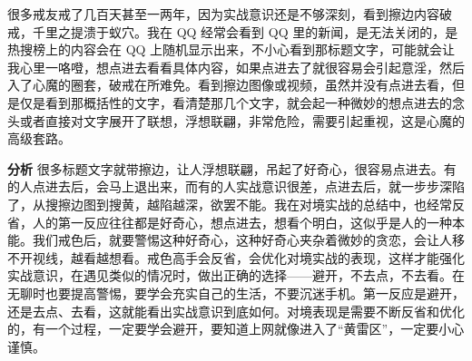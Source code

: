 \begin{case}
    很多戒友戒了几百天甚至一两年，因为实战意识还是不够深刻，看到擦边内容破戒，千里之提溃于蚁穴。我在 QQ 经常会看到 QQ 里的新闻，是无法关闭的，是热搜榜上的内容会在 QQ 上随机显示出来，不小心看到那标题文字，可能就会让我心里一咯噔，想点进去看看具体内容，如果点进去了就很容易会引起意淫，然后入了心魔的圈套，破戒在所难免。看到擦边图像或视频，虽然并没有点进去看，但是仅是看到那概括性的文字，看清楚那几个文字，就会起一种微妙的想点进去的念头或者直接对文字展开了联想，浮想联翩，非常危险，需要引起重视，这是心魔的高级套路。

    \textbf{分析} 很多标题文字就带擦边，让人浮想联翩，吊起了好奇心，很容易点进去。有的人点进去后，会马上退出来，而有的人实战意识很差，点进去后，就一步步深陷了，从搜擦边图到搜黄，越陷越深，欲罢不能。我在对境实战的总结中，也经常反省，人的第一反应往往都是好奇心，想点进去，想看个明白，这似乎是人的一种本能。我们戒色后，就要警惕这种好奇心，这种好奇心夹杂着微妙的贪恋，会让人移不开视线，越看越想看。戒色高手会反省，会优化对境实战的表现，这样才能强化实战意识，在遇见类似的情况时，做出正确的选择——避开，不去点，不去看。在无聊时也要提高警惕，要学会充实自己的生活，不要沉迷手机。第一反应是避开，还是去点、去看，这就能看出实战意识到底如何。对境表现是需要不断反省和优化的，有一个过程，一定要学会避开，要知道上网就像进入了“黄雷区”，一定要小心谨慎。
\end{case}

